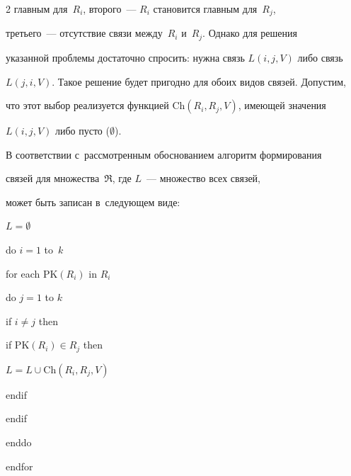 \begin{multicols}{2}
главным для~$R_i$, второго~--- $R_i$ становится главным для~$R_j$,

третьего~--- отсутствие связи между~$R_i$ и~$R_j$. Однако для решения

указанной проб\-ле\-мы достаточно спросить: нужна связь $L(i,j,V)$ либо связь

$L(j,i,V)$. Такое решение будет пригодно для обоих видов связей. Допустим,

что этот выбор реализуется функцией $\mathrm{Ch}(R_i, R_j, V)$, имеющей значения

$L(i,j,V)$ либо пусто ($\emptyset$).



  В соответствии с~рассмотренным обоснованием алгоритм формирования

связей для множества~$\mathfrak{R}$, где $L$~--- множество всех связей,

может быть записан в~следующем виде:



\noindent

$L=\emptyset$



\noindent

do $i=1$ to~$k$



\hspace*{2mm}for each $\mathrm{PK}(R_i)$ in $R_i$



\hspace*{4mm}do $j=1$ to $k$



\hspace*{6mm}if $i\not= j$ then



\hspace*{8mm}if $\mathrm{PK}(R_i)\in R_j$ then



\hspace*{9mm}$L=L\cup \mathrm{Ch}(R_i,R_j,V)$



\hspace*{8mm} endif



\hspace*{6mm}endif



\hspace*{4mm}enddo



\hspace*{2mm}endfor




\end{multicols}
